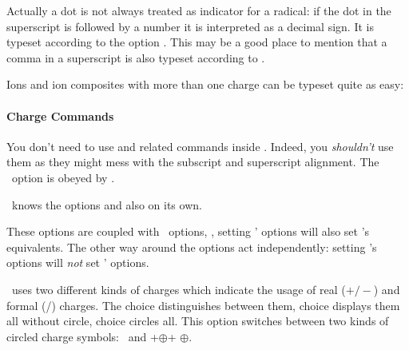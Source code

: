 \documentclass[load-preamble+]{cnltx-doc}
\begin{document}
Actually a dot  is not always treated as
indicator for a radical: if the dot in the superscript is followed by a number
it is interpreted as a decimal sign.  It is typeset according to the option
.  This may be a good place to mention that a comma
\code{,} in a superscript is also typeset according to
.

\begin{example}
  \par
\end{example}

Ions and ion composites with more than one charge can be typeset quite as
easy:
\begin{example}
   
\end{example}

\paragraph{Charge Commands}
You don't need to use  and related commands inside .  Indeed,
you \emph{shouldn't} use them as they might mess with the subscript and
superscript alignment.  The \chemmacros\ option  is obeyed by
.
\begin{example}
\end{example}

\chemformula\ knows the options  and  also
on its own.

\begin{example}
\end{example}

These options are coupled with \chemmacros\ options, \ie, setting \chemmacros'
options will also set \chemformula's equivalents.  The other way around the
options act independently: setting \chemformula's options will \emph{not} set
\chemmacros' options.
\begin{options}
    \chemformula\ uses two different kinds of charges which indicate the usage
    of real ($+/-$) and formal (\fplus/\fminus) charges.  The choice
     distinguishes between them, choice  displays them
    all without circle, choice  circles all.
    This option switches between two kinds of circled charge symbols:
     \fplus\ and \verbcode+$\oplus$+ $\oplus$.
\end{options}
\end{document}
